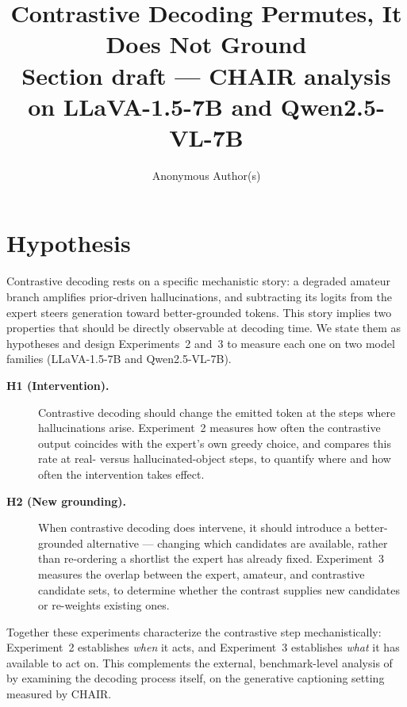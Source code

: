 \documentclass{article}
\title{Contrastive Decoding Permutes, It Does Not Ground\\
\large Section draft --- CHAIR analysis on LLaVA-1.5-7B and Qwen2.5-VL-7B}
\author{Anonymous Author(s)}
\begin{document}
\maketitle


\section{Hypothesis}
\label{sec:cdmech-hypothesis}

Contrastive decoding rests on a specific mechanistic story: a degraded amateur
branch amplifies prior-driven hallucinations, and subtracting its logits from
the expert steers generation toward better-grounded tokens. This story implies
two properties that should be directly observable at decoding time. We state
them as hypotheses and design Experiments~2 and~3 to measure each one on two
model families (LLaVA-1.5-7B and Qwen2.5-VL-7B).

\begin{description}
  \item[\textbf{H1 (Intervention).}] Contrastive decoding should change the
  emitted token at the steps where hallucinations arise. Experiment~2 measures
  how often the contrastive output coincides with the expert's own greedy
  choice, and compares this rate at real- versus hallucinated-object steps, to
  quantify where and how often the intervention takes effect.
  \item[\textbf{H2 (New grounding).}] When contrastive decoding does intervene,
  it should introduce a better-grounded alternative --- changing which
  candidates are available, rather than re-ordering a shortlist the expert has
  already fixed. Experiment~3 measures the overlap between the expert, amateur,
  and contrastive candidate sets, to determine whether the contrast supplies new
  candidates or re-weights existing ones.
\end{description}

\noindent Together these experiments characterize the contrastive step
mechanistically: Experiment~2 establishes \emph{when} it acts, and Experiment~3
establishes \emph{what} it has available to act on. This complements the
external, benchmark-level analysis of \citet{yin2025mirage} by examining the
decoding process itself, on the generative captioning setting measured by CHAIR.
\end{document}
